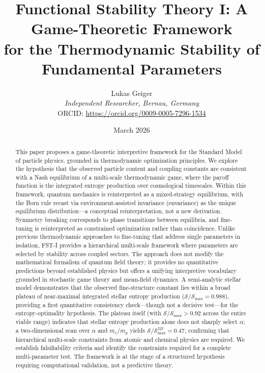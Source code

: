 \documentclass[12pt,a4paper]{article}
\title{Functional Stability Theory I: A Game-Theoretic Framework\\for the Thermodynamic Stability of Fundamental Parameters}
\author{Lukas Geiger\\
\textit{Independent Researcher, Bernau, Germany}\\
ORCID: \url{https://orcid.org/0009-0005-7296-1534}}
\date{March 2026}
\theoremstyle{remark}
\begin{document}
\maketitle

\begin{abstract}
This paper proposes a game-theoretic interpretive framework for the Standard Model of particle physics, grounded in thermodynamic optimization principles. We explore the hypothesis that the observed particle content and coupling constants are consistent with a Nash equilibrium of a multi-scale thermodynamic game, where the payoff function is the integrated entropy production over cosmological timescales. Within this framework, quantum mechanics is reinterpreted as a mixed-strategy equilibrium, with the Born rule recast via environment-assisted invariance (envariance) as the unique equilibrium distribution---a conceptual reinterpretation, not a new derivation. Symmetry breaking corresponds to phase transitions between equilibria, and fine-tuning is reinterpreted as constrained optimization rather than coincidence. Unlike previous thermodynamic approaches to fine-tuning that address single parameters in isolation, FST-I provides a hierarchical multi-scale framework where parameters are selected by stability across coupled sectors. The approach does not modify the mathematical formalism of quantum field theory; it provides no quantitative predictions beyond established physics but offers a unifying interpretive vocabulary grounded in stochastic game theory and mean-field dynamics. A semi-analytic stellar model demonstrates that the observed fine-structure constant lies within a broad plateau of near-maximal integrated stellar entropy production ($\mathcal{S}/\mathcal{S}_{\max} = 0.988$), providing a first quantitative consistency check---though not a decisive test---for the entropy-optimality hypothesis. The plateau itself (with $\mathcal{S}/\mathcal{S}_{\max} > 0.92$ across the entire viable range) indicates that stellar entropy production alone does not sharply select $\alpha$; a two-dimensional scan over $\alpha$ and $m_e/m_p$ yields $\mathcal{S}/\mathcal{S}_{\max}^{2D} = 0.47$, confirming that hierarchical multi-scale constraints from atomic and chemical physics are required. We establish falsifiability criteria and identify the constraints required for a complete multi-parameter test. The framework is at the stage of a structured hypothesis requiring computational validation, not a predictive theory.
\end{abstract}
\end{document}
